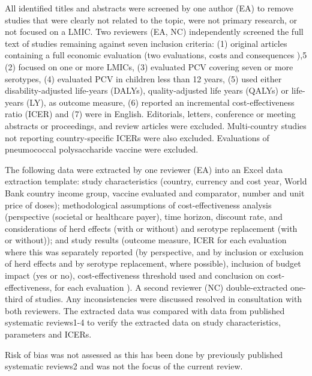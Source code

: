 \documentclass[12pt]{article}
\begin{document}
All identified titles and abstracts were screened by one author (EA) to remove studies that were clearly not related to the topic, were not primary research, or not focused on a LMIC. Two reviewers (EA, NC) independently screened the full text of studies remaining against seven inclusion criteria: (1) original articles containing a full economic evaluation (two evaluations, costs and consequences ),5 (2) focused on one or more LMICs, (3) evaluated PCV covering seven or more serotypes, (4) evaluated PCV in children less than 12 years, (5) used either disability-adjusted life-years (DALYs), quality-adjusted life years (QALYs) or life-years (LY), as outcome measure, (6) reported an incremental cost-effectiveness ratio (ICER) and (7) were in English. Editorials, letters, conference or meeting abstracts or proceedings, and review articles were excluded. Multi-country studies not reporting country-specific ICERs were also excluded. Evaluations of pneumococcal polysaccharide vaccine were excluded.

The following data were extracted by one reviewer (EA) into an Excel data extraction template: study characteristics (country, currency and cost year, World Bank country income group, vaccine evaluated and comparator, number and unit price of doses); methodological assumptions of cost-effectiveness analysis (perspective (societal or healthcare payer), time horizon, discount rate, and considerations of herd effects (with or without) and serotype replacement (with or without)); and study results (outcome measure, ICER for each evaluation where this was separately reported (by perspective, and by inclusion or exclusion of herd effects and by serotype replacement, where possible), inclusion of budget impact (yes or no), cost-effectiveness threshold used and conclusion on cost-effectiveness, for each evaluation ). A second reviewer (NC) double-extracted one-third of studies. Any inconsistencies were discussed resolved in consultation with both reviewers. The extracted data was compared with data from published systematic reviews1-4 to verify the extracted data on study characteristics, parameters and ICERs. 

Risk of bias was not assessed as this has been done by previously published systematic reviews2 and was not the focus of the current review.
\end{document}
